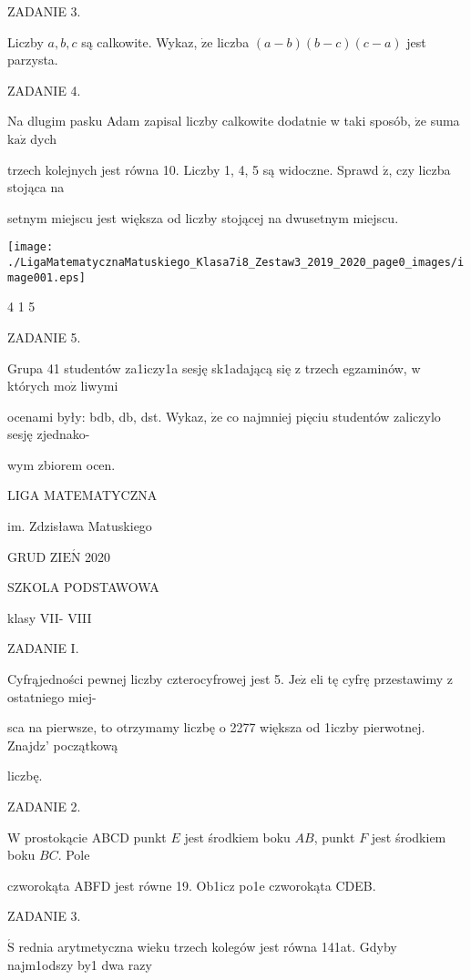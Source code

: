 \documentclass[a4paper,12pt]{article}
\begin{document}
ZADANIE 3.

Liczby $a, b, c$ są calkowite. Wykaz, $\dot{\mathrm{z}}\mathrm{e}$ liczba $(a-b)(b-c)(c-a)$ jest parzysta.

ZADANIE 4.

Na dlugim pasku Adam zapisal liczby calkowite dodatnie w taki sposób, $\dot{\mathrm{z}}\mathrm{e}$ suma $\mathrm{k}\mathrm{a}\dot{\mathrm{z}}$ dych

trzech kolejnych jest równa 10. Liczby 1, 4, 5 są widoczne. Sprawd $\acute{\mathrm{z}}$, czy liczba stojąca na

setnym miejscu jest większa od liczby stojącej na dwusetnym miejscu.
\begin{center}
\texttt{[image: ./LigaMatematycznaMatuskiego\_Klasa7i8\_Zestaw3\_2019\_2020\_page0\_images/image001.eps]}
\end{center}
4 1  5

ZADANIE 5.

Grupa 41 studentów za1iczy1a sesję sk1adającą się z trzech egzaminów, w których $\mathrm{m}\mathrm{o}\dot{\mathrm{z}}$ liwymi

ocenami były: bdb, db, dst. Wykaz, $\dot{\mathrm{z}}\mathrm{e}$ co najmniej pięciu studentów zaliczylo sesję zjednako-

wym zbiorem ocen.






LIGA MATEMATYCZNA

im. Zdzisława Matuskiego

GRUD Z$\mathrm{I}\mathrm{E}\acute{\mathrm{N}}$ 2020

SZKOLA PODSTAWOWA

klasy VII- VIII

ZADANIE I.

Cyfrąjedności pewnej liczby czterocyfrowej jest 5. $\mathrm{J}\mathrm{e}\dot{\mathrm{z}}$ eli tę cyfrę przestawimy z ostatniego miej-

sca na pierwsze, to otrzymamy liczbę o 2277 większa od 1iczby pierwotnej. Znajdz' początkową

liczbę.

ZADANIE 2.

$\mathrm{W}$ prostokącie ABCD punkt $E$ jest środkiem boku $AB$, punkt $F$ jest środkiem boku $BC$. Pole

czworokąta ABFD jest równe 19. Ob1icz po1e czworokąta CDEB.

ZADANIE 3.

$\acute{\mathrm{S}}$ rednia arytmetyczna wieku trzech kolegów jest równa 141at. Gdyby najm1odszy by1 dwa razy
\end{document}

